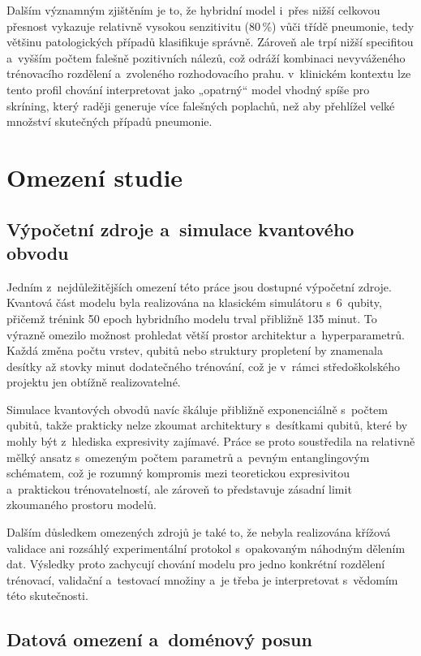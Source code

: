 \documentclass[12pt, a4paper]{report}
\begin{document}
Dalším významným zjištěním je to, že hybridní model i~přes nižší celkovou přesnost vykazuje relativně vysokou senzitivitu (80\,\%) vůči třídě pneumonie, tedy většinu patologických případů klasifikuje správně. Zároveň ale trpí nižší specifitou a~vyšším počtem falešně pozitivních nálezů, což odráží kombinaci nevyváženého trénovacího rozdělení a~zvoleného rozhodovacího prahu. v~klinickém kontextu lze tento profil chování interpretovat jako „opatrný“ model vhodný spíše pro skríning, který raději generuje více falešných poplachů, než aby přehlížel velké množství skutečných případů pneumonie.

\section{Omezení studie} \label{sec:omezeni}

\subsection{Výpočetní zdroje a~simulace kvantového obvodu}

Jedním z~nejdůležitějších omezení této práce jsou dostupné výpočetní zdroje. Kvantová část modelu byla realizována na klasickém simulátoru s~6~qubity, přičemž trénink 50 epoch hybridního modelu trval přibližně 135 minut. To výrazně omezilo možnost prohledat větší prostor architektur a~hyperparametrů. Každá změna počtu vrstev, qubitů nebo struktury propletení by znamenala desítky až stovky minut dodatečného trénování, což je v~rámci středoškolského projektu jen obtížně realizovatelné.

Simulace kvantových obvodů navíc škáluje přibližně exponenciálně s~počtem qubitů, takže prakticky nelze zkoumat architektury s~desítkami qubitů, které by mohly být z~hlediska expresivity zajímavé. Práce se proto soustředila na relativně mělký ansatz s~omezeným počtem parametrů a~pevným entanglingovým schématem, což je rozumný kompromis mezi teoretickou expresivitou a~praktickou trénovatelností, ale zároveň to představuje zásadní limit zkoumaného prostoru modelů.

Dalším důsledkem omezených zdrojů je také to, že nebyla realizována křížová validace ani rozsáhlý experimentální protokol s~opakovaným náhodným dělením dat. Výsledky proto zachycují chování modelu pro jedno konkrétní rozdělení trénovací, validační a~testovací množiny a~je třeba je interpretovat s~vědomím této skutečnosti.

\subsection{Datová omezení a~doménový posun}
\end{document}
